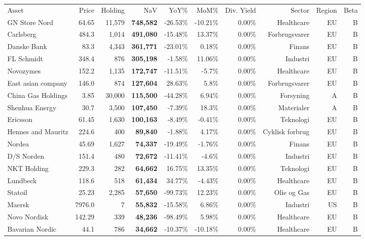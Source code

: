 \begin{tabular}{lrrrrrrrrr}

Asset & Price & Holding & NaV & YoY\% & MoM\% & Div. Yield & Sector & Region & Beta \\

GN Store Nord & 64.65 & 11,579 & \bf{748,582} & -26.53\% & -10.21\% & 0.00\% & Healthcare & EU & B\\
Carlsberg & 484.3 & 1,014 & \bf{491,080} & -15.48\% & 13.37\% & 0.00\% & Forbrugsvarer & EU & B\\
Danske Bank & 83.3 & 4,343 & \bf{361,771} & -23.01\% & 0.18\% & 0.00\% & Finans & EU & B\\
FL Schmidt & 348.4 & 876 & \bf{305,198} & -1.58\% & 11.06\% & 0.00\% & Industri & EU & B\\
Novozymes & 152.2 & 1,135 & \bf{172,747} & -11.51\% & -5.7\% & 0.00\% & Healthcare & EU & B\\
East asian company & 146.0 & 874 & \bf{127,604} & 28.63\% & 5.8\% & 0.00\% & Forbrugsvarer & EU & B\\
China Gas Holdings & 3.85 & 30,000 & \bf{115,500} & -44.28\% & 6.94\% & 0.00\% & Forsyning & A & B\\
Shenhua Energy & 30.7 & 3,500 & \bf{107,450} & -7.39\% & 18.3\% & 0.00\% & Materialer & A & B\\
Ericsson & 61.45 & 1,630 & \bf{100,163} & -8.49\% & -0.41\% & 0.00\% & Teknologi & EU & B\\
Hennes and Mauritz & 224.6 & 400 & \bf{89,840} & -1.88\% & 4.17\% & 0.00\% & Cyklisk forbrug & EU & B\\
Nordea & 45.69 & 1,627 & \bf{74,337} & -19.49\% & -1.76\% & 0.00\% & Finans & EU & B\\
D/S Norden & 151.4 & 480 & \bf{72,672} & -11.41\% & -4.6\% & 0.00\% & Industri & EU & B\\
NKT Holding & 229.3 & 282 & \bf{64,662} & 16.75\% & 13.35\% & 0.00\% & Teknologi & EU & B\\
Lundbeck & 118.6 & 518 & \bf{61,434} & 34.77\% & -4.43\% & 0.00\% & Healthcare & EU & B\\
Statoil & 25.23 & 2,285 & \bf{57,650} & -99.73\% & 12.23\% & 0.00\% & Olie og Gas & EU & B\\
Maersk & 7976.0 & 7 & \bf{55,832} & -15.58\% & 6.86\% & 0.00\% & Industri & US & B\\
Novo Nordisk & 142.29 & 339 & \bf{48,236} & -98.49\% & 5.98\% & 0.00\% & Healthcare & EU & B\\
Bavarian Nordic & 44.1 & 786 & \bf{34,662} & -10.37\% & -10.18\% & 0.00\% & Healthcare & EU & B\\

\end{tabular}
